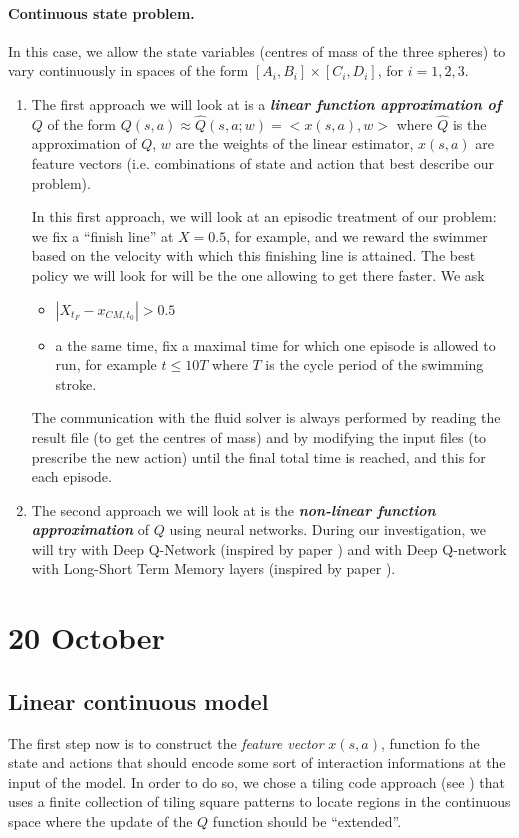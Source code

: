 \documentclass{article}
\begin{document}
\paragraph{Continuous state problem.} In this case, we allow the state variables (centres of mass of the three spheres) to vary continuously in spaces of the form $[A_i,B_i]\times[C_i,D_i]$, for $i=1,2,3$.
\begin{enumerate}
\item The first approach we will look at is  a \emph{\textbf{linear function approximation of $Q$}} of the form $Q(s,a)\approx\hat{Q}(s,a;w) = <x(s,a),w>$ where $\hat{Q}$ is the approximation of $Q$, $w$ are the weights of the linear estimator, $x(s,a)$ are feature vectors (i.e. combinations of state and action that best describe our problem).

In this first approach, we will look at an episodic treatment of our problem: we fix a ``finish line'' at $X=0.5$, for example, and we reward the swimmer based on the velocity with which this finishing line is attained. The best policy we will look for will be the one allowing to get there faster. We ask
\begin{itemize}
	\item $|X_{t_F}-x_{CM,t_0}|>0.5$  
	\item a the same time, fix a maximal time for which one episode is allowed to run, for example $t \le 10 T$ where $T$ is the cycle period of the swimming stroke. 
\end{itemize}
The communication with the fluid solver is always performed by reading the result file (to get the centres of mass) and by modifying the input files (to prescribe the new action) until the final total time is reached, and this for each episode.
\item The second approach we will look at is the \emph{\textbf{non-linear function approximation}} of $Q$ using neural networks. During our investigation, we will try with Deep Q-Network (inspired by paper \cite{novati_synchronisation_2017}) and with Deep Q-network with Long-Short Term Memory layers (inspired by paper \cite{verma_efficient_2018}).
\end{enumerate}
\section{20 October}
\subsection{Linear continuous model}
The first step now is to construct the \textit{feature vector} $x(s,a)$, function fo the state and actions that should encode some sort of interaction informations at the input of the model. In order to do so, we chose a tiling code approach (see \cite[Section 9.5]{sutton_reinforcement_2018}) that uses a finite collection of tiling square patterns to locate regions in the continuous space where the update of the $Q$ function should be ``extended''. 
\end{document}
